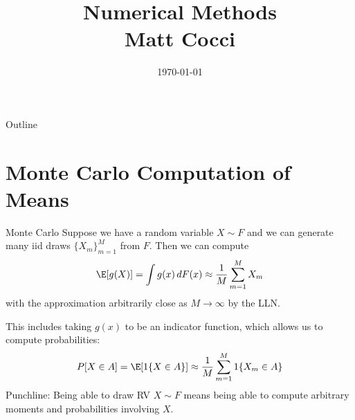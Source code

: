\documentclass[aspectratio=169, handout]{beamer}
\title[]{Numerical Methods \\ Matt Cocci}
\author[]{}
\date{\today}
\newcommand{\ra}{\rightarrow}
\begin{document}
\begin{frame}[plain]
\titlepage
\end{frame}


\begin{frame}{Outline}
\tableofcontents[hideallsubsections]
\end{frame}


\section{Monte Carlo Computation of Means}


{\footnotesize
\begin{frame}{Monte Carlo}
Suppose we have a random variable $X\sim F$ and we can generate many
iid \alert{draws} $\{X_m\}_{m=1}^M$ from $F$.
Then we can compute
\begin{align*}
  \E[g(X)]
  =
  \int g(x)\,dF(x)
  \approx
  \frac{1}{M}
  \sum_{m=1}^M
  X_m
\end{align*}
with the approximation arbitrarily close as $M\ra\infty$ by the LLN.


This includes taking $g(x)$ to be an indicator function, which allows us
to compute probabilities:
\begin{align*}
  P[X\in A]
  =
  \E[1\{X\in A\}]
  \approx
  \frac{1}{M}
  \sum_{m=1}^M
  1\{X_m\in A\}
\end{align*}
\alert{Punchline}:
Being able to draw RV $X\sim F$ means being able to compute arbitrary
moments and probabilities involving $X$.
\end{frame}
}
\end{document}
